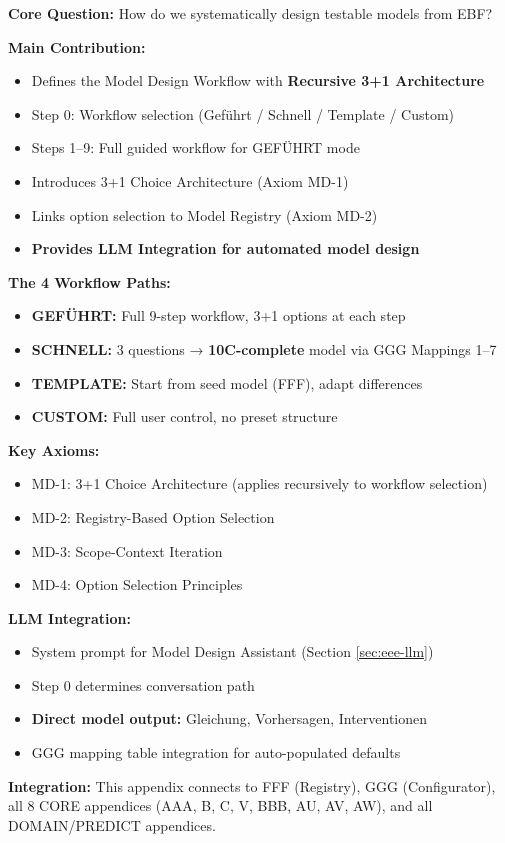 \begin{tcolorbox}[colback=green!10!white, colframe=green!75!black,
    title=\textbf{Appendix UNMAPPED_DSN: Summary}]

\textbf{Core Question:} How do we systematically design testable models from EBF?

\textbf{Main Contribution:}
\begin{itemize}[nosep]
    \item Defines the Model Design Workflow with \textbf{Recursive 3+1 Architecture}
    \item Step 0: Workflow selection (Geführt / Schnell / Template / Custom)
    \item Steps 1--9: Full guided workflow for GEFÜHRT mode
    \item Introduces 3+1 Choice Architecture (Axiom MD-1)
    \item Links option selection to Model Registry (Axiom MD-2)
    \item \textbf{Provides LLM Integration for automated model design}
\end{itemize}

\textbf{The 4 Workflow Paths:}
\begin{itemize}[nosep]
    \item \textbf{GEFÜHRT:} Full 9-step workflow, 3+1 options at each step
    \item \textbf{SCHNELL:} 3 questions → \textbf{10C-complete} model via GGG Mappings 1--7
    \item \textbf{TEMPLATE:} Start from seed model (FFF), adapt differences
    \item \textbf{CUSTOM:} Full user control, no preset structure
\end{itemize}

\textbf{Key Axioms:}
\begin{itemize}[nosep]
    \item MD-1: 3+1 Choice Architecture (applies recursively to workflow selection)
    \item MD-2: Registry-Based Option Selection
    \item MD-3: Scope-Context Iteration
    \item MD-4: Option Selection Principles
\end{itemize}

\textbf{LLM Integration:}
\begin{itemize}[nosep]
    \item System prompt for Model Design Assistant (Section \ref{sec:eee-llm})
    \item Step 0 determines conversation path
    \item \textbf{Direct model output:} Gleichung, Vorhersagen, Interventionen
    \item GGG mapping table integration for auto-populated defaults
\end{itemize}

\textbf{Integration:} This appendix connects to FFF (Registry), GGG (Configurator),
all 8 CORE appendices (AAA, B, C, V, BBB, AU, AV, AW), and all DOMAIN/PREDICT appendices.

\end{tcolorbox}


